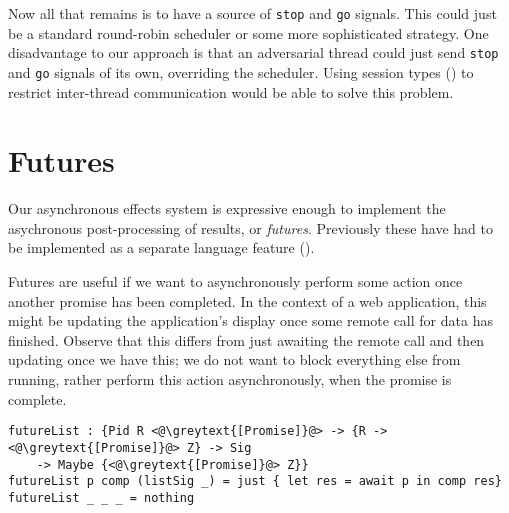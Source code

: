 \documentclass[msc,deptreport,cs]{infthesis} %
\newcommand{\code}[1]{\lstinline{#1}}
\newcommand{\greytext}[1]{\textcolor{black!40}{#1}}
\begin{document}



Now all that remains is to have a source of \code{stop} and \code{go} signals.
This could just be a standard round-robin scheduler or some more sophisticated
strategy. One disadvantage to our approach is that an adversarial thread could
just send \code{stop} and \code{go} signals of its own, overriding the
scheduler. Using session types (\cite{honda1998language}) to restrict
inter-thread communication would be able to solve this problem.

\section{Futures}
\label{sec:futures}

Our asynchronous effects system is expressive enough to implement the
asychronous post-processing of results, or \emph{futures}. Previously these have
had to be implemented as a separate language feature
(\cite{schwinghammer2002concurrent}).

Futures are useful if we want to asynchronously perform some action once another
promise has been completed. In the context of a web application, this might be
updating the application's display once some remote call for data has finished.
Observe that this differs from just awaiting the remote call and then updating
once we have this; we do not want to block everything else from running, rather
perform this action asynchronously, when the promise is complete.

\begin{lstlisting}
futureList : {Pid R <@\greytext{[Promise]}@> -> {R -> <@\greytext{[Promise]}@> Z} -> Sig
    -> Maybe {<@\greytext{[Promise]}@> Z}}
futureList p comp (listSig _) = just { let res = await p in comp res}
futureList _ _ _ = nothing
\end{lstlisting}
\end{document}
